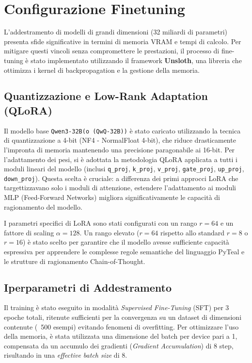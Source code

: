 \section{Configurazione Finetuning}

\label{sec:training_setup}

L'addestramento di modelli di grandi dimensioni (32 miliardi di parametri) presenta sfide significative in termini di memoria VRAM e tempi di calcolo. Per mitigare questi vincoli senza compromettere le prestazioni, il processo di fine-tuning è stato implementato utilizzando il framework \textbf{Unsloth}, una libreria che ottimizza i kernel di backpropagation e la gestione della memoria.

\subsection{Quantizzazione e Low-Rank Adaptation (QLoRA)}
Il modello base \texttt{Qwen3-32B(o (QwQ-32B))} è stato caricato utilizzando la tecnica di quantizzazione a 4-bit (NF4 - NormalFloat 4-bit), che riduce drasticamente l'impronta di memoria mantenendo una precisione paragonabile ai 16-bit. 
Per l'adattamento dei pesi, si è adottata la metodologia QLoRA applicata a tutti i moduli lineari del modello (inclusi \texttt{q\_proj}, \texttt{k\_proj}, \texttt{v\_proj}, \texttt{gate\_proj}, \texttt{up\_proj}, \texttt{down\_proj}). Questa scelta è cruciale: a differenza dei primi approcci LoRA che targettizzavano solo i moduli di attenzione, estendere l'adattamento ai moduli MLP (Feed-Forward Networks) migliora significativamente le capacità di ragionamento del modello.

I parametri specifici di LoRA sono stati configurati con un rango $r=64$ e un fattore di scaling $\alpha=128$. Un rango elevato ($r=64$ rispetto allo standard $r=8$ o $r=16$) è stato scelto per garantire che il modello avesse sufficiente capacità espressiva per apprendere le complesse regole semantiche del linguaggio PyTeal e le strutture di ragionamento Chain-of-Thought.

\subsection{Iperparametri di Addestramento}
Il training è stato eseguito in modalità \textit{Supervised Fine-Tuning} (SFT) per 3 epoche totali, ritenute sufficienti per la convergenza su un dataset di dimensioni contenute (~500 esempi) evitando fenomeni di overfitting. 
Per ottimizzare l'uso della memoria, è stata utilizzata una dimensione del batch per device pari a 1, compensata da un accumulo dei gradienti (\textit{Gradient Accumulation}) di 8 step, risultando in una \textit{effective batch size} di 8.

